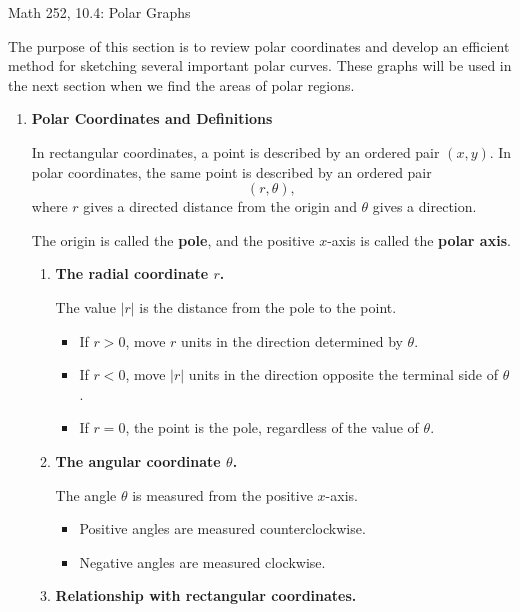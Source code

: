 \documentclass[11pt,letterpaper]{article}
\begin{document}
\begin{center}
\Large Math 252, 10.4: Polar Graphs\\ \normalsize
\end{center}

The purpose of this section is to review polar coordinates and develop an efficient method for sketching several important polar curves. These graphs will be used in the next section when we find the areas of polar regions.

\begin{enumerate}

\item \textbf{Polar Coordinates and Definitions}

In rectangular coordinates, a point is described by an ordered pair $(x,y)$. In polar coordinates, the same point is described by an ordered pair
\[
(r,\theta),
\]
where $r$ gives a directed distance from the origin and $\theta$ gives a direction.

The origin is called the \textbf{pole}, and the positive $x$-axis is called the \textbf{polar axis}.

\begin{enumerate}
\item \textbf{The radial coordinate $r$.}

The value $|r|$ is the distance from the pole to the point.
\begin{itemize}[leftmargin=.28in,itemsep=2pt]
\item If $r>0$, move $r$ units in the direction determined by $\theta$.
\item If $r<0$, move $|r|$ units in the direction opposite the terminal side of $\theta$.
\item If $r=0$, the point is the pole, regardless of the value of $\theta$.
\end{itemize}

\item \textbf{The angular coordinate $\theta$.}

The angle $\theta$ is measured from the positive $x$-axis.
\begin{itemize}[leftmargin=.28in,itemsep=2pt]
\item Positive angles are measured counterclockwise.
\item Negative angles are measured clockwise.
\end{itemize}

\item \textbf{Relationship with rectangular coordinates.}


\end{enumerate}
\end{enumerate}
\end{document}
